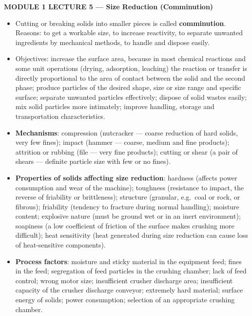 \documentclass[10pt,a4paper]{article}
\newcommand{\spsection}[1]{%
  \par\addvspace{10pt}%
  \noindent\begin{tcolorbox}[
      colback=accent,colframe=accent,boxrule=0pt,arc=1.2pt,
      left=7pt,right=7pt,top=5pt,bottom=5pt,width=\linewidth,
      before skip=0pt,after skip=7pt]
    \color{white}\bfseries\large #1
  \end{tcolorbox}\par\vspace{-2pt}\nopagebreak
}
\newcommand{\spsub}[1]{\par\addvspace{7pt}\noindent{\color{accent}\bfseries #1}\par\addvspace{3pt}\nopagebreak}
\begin{document}
\spsection{MODULE 1 \textperiodcentered{} LECTURE 5 --- Size Reduction (Comminution)}

\spsub{Purpose, mechanisms, influencing factors}
\begin{itemize}
  \item Cutting or breaking solids into smaller pieces is called \textbf{comminution}. Reasons: to get a workable size, to increase reactivity, to separate unwanted ingredients by mechanical methods, to handle and dispose easily.
  \item Objectives: increase the surface area, because in most chemical reactions and some unit operations (drying, adsorption, leaching) the reaction or transfer is directly proportional to the area of contact between the solid and the second phase; produce particles of the desired shape, size or size range and specific surface; separate unwanted particles effectively; dispose of solid wastes easily; mix solid particles more intimately; improve handling, storage and transportation characteristics.
  \item \textbf{Mechanisms}: compression (nutcracker --- coarse reduction of hard solids, very few fines); impact (hammer --- coarse, medium and fine products); attrition or rubbing (file --- very fine products); cutting or shear (a pair of shears --- definite particle size with few or no fines).
  \item \textbf{Properties of solids affecting size reduction}: hardness (affects power consumption and wear of the machine); toughness (resistance to impact, the reverse of friability or brittleness); structure (granular, e.g.\ coal or rock, or fibrous); friability (tendency to fracture during normal handling); moisture content; explosive nature (must be ground wet or in an inert environment); soapiness (a low coefficient of friction of the surface makes crushing more difficult); heat sensitivity (heat generated during size reduction can cause loss of heat-sensitive components).
  \item \textbf{Process factors}: moisture and sticky material in the equipment feed; fines in the feed; segregation of feed particles in the crushing chamber; lack of feed control; wrong motor size; insufficient crusher discharge area; insufficient capacity of the crusher discharge conveyor; extremely hard material; surface energy of solids; power consumption; selection of an appropriate crushing chamber.
\end{itemize}
\end{document}
